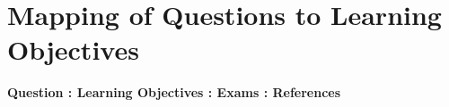 \chapter*{Mapping of Questions to Learning Objectives}

{\bf Question : Learning Objectives : Exams : References} 


\pagebreak
